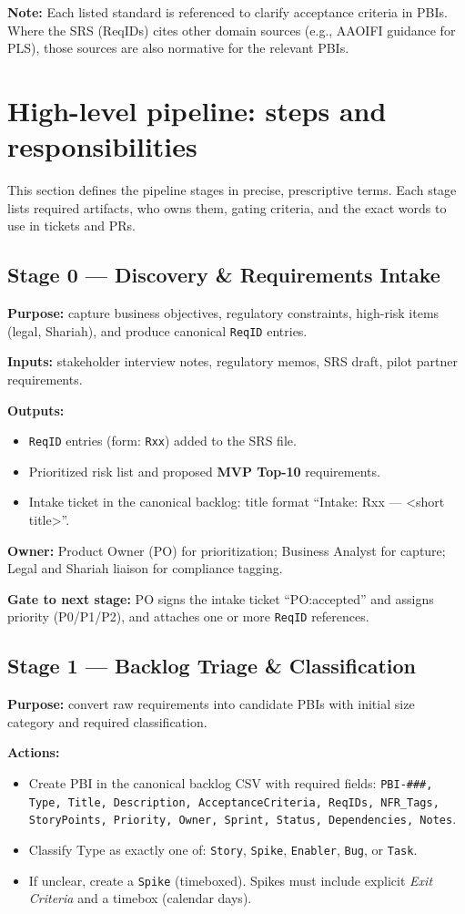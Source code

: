 \documentclass[11pt,a4paper]{article}
\begin{document}
\textbf{Note:} Each listed standard is referenced to clarify acceptance criteria in PBIs. Where the SRS (ReqIDs) cites other domain sources (e.g., AAOIFI guidance for PLS), those sources are also normative for the relevant PBIs.

\section{High-level pipeline: steps and responsibilities}\label{sec:pipeline}
This section defines the pipeline stages in precise, prescriptive terms. Each stage lists required artifacts, who owns them, gating criteria, and the exact words to use in tickets and PRs.

\subsection{Stage 0 — Discovery \& Requirements Intake}
\textbf{Purpose:} capture business objectives, regulatory constraints, high-risk items (legal, Shariah), and produce canonical \texttt{ReqID} entries.

\textbf{Inputs:} stakeholder interview notes, regulatory memos, SRS draft, pilot partner requirements.

\textbf{Outputs:}
\begin{itemize}
  \item \texttt{ReqID} entries (form: \texttt{Rxx}) added to the SRS file.
  \item Prioritized risk list and proposed \textbf{MVP Top-10} requirements.
  \item Intake ticket in the canonical backlog: title format ``Intake: Rxx — \textless short title\textgreater''.
\end{itemize}

\textbf{Owner:} Product Owner (PO) for prioritization; Business Analyst for capture; Legal and Shariah liaison for compliance tagging.

\textbf{Gate to next stage:} PO signs the intake ticket ``PO:accepted'' and assigns priority (P0/P1/P2), and attaches one or more \texttt{ReqID} references.

\subsection{Stage 1 — Backlog Triage \& Classification}
\textbf{Purpose:} convert raw requirements into candidate PBIs with initial size category and required classification.

\textbf{Actions:}
\begin{itemize}
  \item Create PBI in the canonical backlog CSV with required fields: \texttt{PBI-\#\#\#, Type, Title, Description, AcceptanceCriteria, ReqIDs, NFR\_Tags, StoryPoints, Priority, Owner, Sprint, Status, Dependencies, Notes}.
  \item Classify Type as exactly one of: \texttt{Story}, \texttt{Spike}, \texttt{Enabler}, \texttt{Bug}, or \texttt{Task}.
  \item If unclear, create a \texttt{Spike} (timeboxed). Spikes must include explicit \emph{Exit Criteria} and a timebox (calendar days).
\end{itemize}
\end{document}
